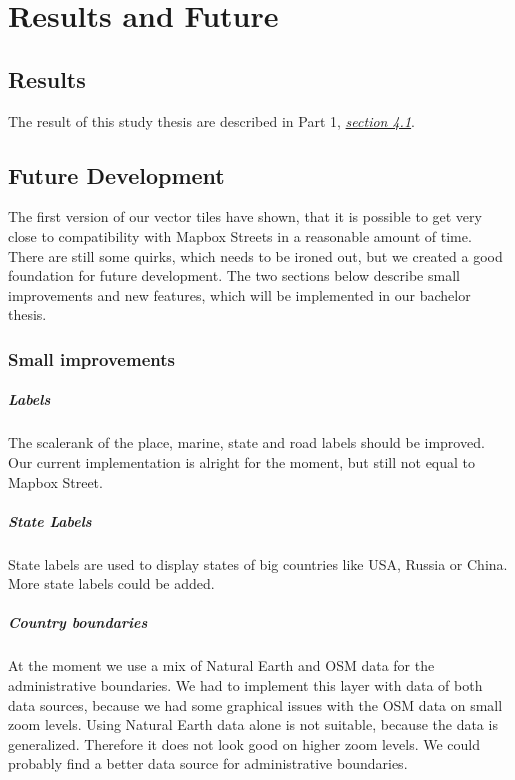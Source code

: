 \chapter{Results and Future}\label{part2_results_and_future}

\section{Results}\label{part2_results}
The result of this study thesis are described in Part 1, \hyperref[part1_results]{\emph{section 4.1}}.

\section{Future Development}\label{part2_future_development}
The first version of our vector tiles have shown, that it is possible to get very close to compatibility with Mapbox Streets in a reasonable amount of time. There are still some quirks, which needs to be ironed out, but we created a good foundation for future development. The two sections below describe small improvements and new features, which will be implemented in our bachelor thesis.

\subsection{Small improvements}\label{small_improvements}
 
\paragraph{Labels}
The scalerank of the place, marine, state and road labels should be improved. Our current implementation is alright for the moment, but still not equal to Mapbox Street.

\paragraph{State Labels}
State labels are used to display states of big countries like USA, Russia or China. More state labels could be added. 

\paragraph{Country boundaries}
At the moment we use a mix of Natural Earth and OSM data for the administrative boundaries. We had to implement this layer with data of both data sources, because we had some graphical issues with the OSM data on small zoom levels. Using Natural Earth data alone is not suitable, because the data is generalized. Therefore it does not look good on higher zoom levels. We could probably find a better data source for administrative boundaries.

